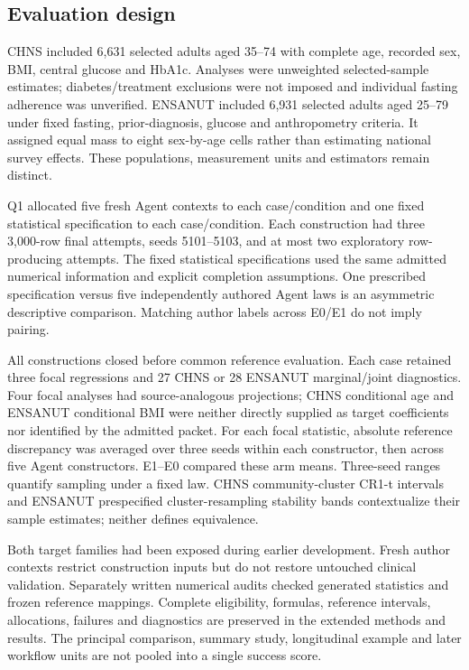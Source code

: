 \documentclass[10pt,twocolumn]{article}
\begin{document}
\subsection{Evaluation design}

CHNS included 6,631 selected adults aged 35–74 with complete age, recorded sex, BMI, central glucose and HbA1c. Analyses were unweighted selected-sample estimates; diabetes/treatment exclusions were not imposed and individual fasting adherence was unverified. ENSANUT included 6,931 selected adults aged 25–79 under fixed fasting, prior-diagnosis, glucose and anthropometry criteria. It assigned equal mass to eight sex-by-age cells rather than estimating national survey effects. These populations, measurement units and estimators remain distinct.


Q1 allocated five fresh Agent contexts to each case/condition and one fixed statistical specification to each case/condition. Each construction had three 3,000-row final attempts, seeds 5101–5103, and at most two exploratory row-producing attempts. The fixed statistical specifications used the same admitted numerical information and explicit completion assumptions. One prescribed specification versus five independently authored Agent laws is an asymmetric descriptive comparison. Matching author labels across E0/E1 do not imply pairing.


All constructions closed before common reference evaluation. Each case retained three focal regressions and 27 CHNS or 28 ENSANUT marginal/joint diagnostics. Four focal analyses had source-analogous projections; CHNS conditional age and ENSANUT conditional BMI were neither directly supplied as target coefficients nor identified by the admitted packet. For each focal statistic, absolute reference discrepancy was averaged over three seeds within each constructor, then across five Agent constructors. E1–E0 compared these arm means. Three-seed ranges quantify sampling under a fixed law. CHNS community-cluster CR1-t intervals and ENSANUT prespecified cluster-resampling stability bands contextualize their sample estimates; neither defines equivalence.


Both target families had been exposed during earlier development. Fresh author contexts restrict construction inputs but do not restore untouched clinical validation. Separately written numerical audits checked generated statistics and frozen reference mappings. Complete eligibility, formulas, reference intervals, allocations, failures and diagnostics are preserved in the extended methods and results. The principal comparison, summary study, longitudinal example and later workflow units are not pooled into a single success score.
\end{document}
